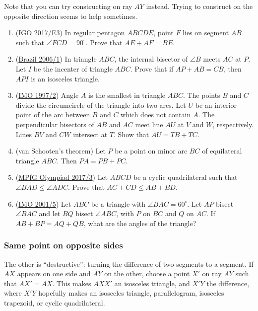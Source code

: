 \documentclass[11pt,paper=letter]{scrartcl}
\begin{document}
Note that you can try constructing on ray $AY$ instead. Trying to construct on the opposite direction seems to help sometimes.

\begin{enumerate}
  \item (\href{https://aops.com/community/c6h1513473}{IGO 2017/E3}) In regular pentagon $ABCDE$, point $F$ lies on segment $AB$ such that $\angle FCD = 90^{\circ}$. Prove that $AE + AF = BE$.

  \item (\href{https://aops.com/community/c6h116955}{Brazil 2006/1}) In triangle $ABC$, the internal bisector of $\angle B$ meets $AC$ at $P$. Let $I$ be the incenter of triangle $ABC$. Prove that if $AP + AB = CB$, then $API$ is an isosceles triangle.

  \item (\href{https://aops.com/community/c6h58299}{IMO 1997/2}) Angle $A$ is the smallest in triangle $ABC$. The points $B$ and $C$ divide the circumcircle of the triangle into two arcs. Let $U$ be an interior point of the arc between $B$ and $C$ which does not contain $A$. The perpendicular bisectors of $AB$ and $AC$ meet line $AU$ at $V$ and $W$, respectively. Lines $BV$ and $CW$ intersect at $T$. Show that $AU = TB + TC$.

  \item (van Schooten's theorem) Let $P$ be a point on minor arc $BC$ of equilateral triangle $ABC$. Then $PA = PB + PC$.

  \item (\href{https://aops.com/community/c132h1546692}{MPfG Olympiad 2017/3}) Let $ABCD$ be a cyclic quadrilateral such that $\angle BAD \le \angle ADC$. Prove that $AC + CD \le AB + BD$.

  \item (\href{https://aops.com/community/c6h17469}{IMO 2001/5}) Let $ABC$ be a triangle with $\angle BAC = 60^{\circ}$. Let $AP$ bisect $\angle BAC$ and let $BQ$ bisect $\angle ABC$, with $P$ on $BC$ and $Q$ on $AC$. If $AB + BP = AQ + QB$, what are the angles of the triangle?
\end{enumerate}

\subsubsection*{Same point on opposite sides}

The other is ``destructive'': turning the difference of two segments to a segment. If $AX$ appears on one side and $AY$ on the other, choose a point $X'$ on ray $AY$ such that $AX' = AX$. This makes $AXX'$ an isosceles triangle, and $X'Y$ the difference, where $X'Y$ hopefully makes an isosceles triangle, parallelogram, isosceles trapezoid, or cyclic quadrilateral.
\end{document}
